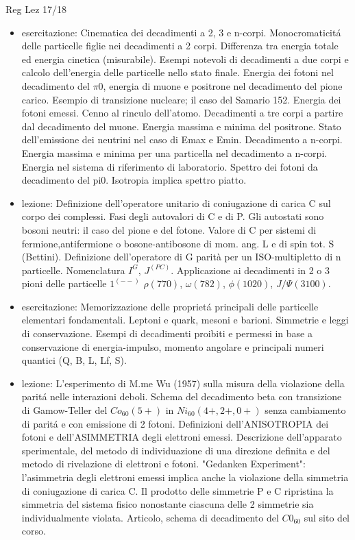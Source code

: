 \begin{frame}[allowframebreaks]{Reg Lez 17/18}
\begin{itemize}
\item esercitazione: Cinematica dei decadimenti a 2, 3 e n-corpi. Monocromaticit\'a delle particelle figlie nei decadimenti a 2 corpi. Differenza tra energia totale ed energia cinetica (misurabile). Esempi notevoli di decadimenti a due corpi e calcolo dell'energia delle particelle nello stato finale. Energia dei fotoni nel decadimento del $\pi0$, energia di muone e positrone nel decadimento del pione carico. Esempio di transizione nucleare; il caso del Samario 152. Energia dei fotoni emessi. Cenno al rinculo dell'atomo. Decadimenti a tre corpi a partire dal decadimento del muone. Energia massima e minima del positrone. Stato dell'emissione dei neutrini nel caso di Emax e Emin. Decadimento a n-corpi. Energia massima e minima per una particella nel decadimento a n-corpi. Energia nel sistema di riferimento di laboratorio. Spettro dei fotoni da decadimento del pi0. Isotropia implica spettro piatto.
\item lezione: Definizione dell'operatore unitario di coniugazione di carica C sul corpo dei complessi. Fasi degli autovalori di C e di P. Gli autostati sono bosoni neutri: il caso del pione e del fotone. Valore di C per sistemi di fermione,antifermione o bosone-antibosone di mom. ang. L e di spin tot. S (Bettini). Definizione dell'operatore di G parità per un ISO-multipletto di n particelle. Nomenclatura $I^G$, $J^{(PC)}$. Applicazione ai decadimenti in 2 o 3 pioni delle particelle $1^{(--)}$ $\rho(770)$, $\omega(782)$, $\phi(1020)$, $J/\Psi(3100)$.
\item esercitazione: Memorizzazione delle propriet\'a principali delle particelle elementari fondamentali. Leptoni e quark, mesoni e barioni. Simmetrie e leggi di conservazione. Esempi di decadimenti proibiti e permessi in base a conservazione di energia-impulso, momento angolare e principali numeri quantici (Q, B, L, Lf, S).
\item lezione: L'esperimento di M.me Wu (1957) sulla misura della violazione della parit\'a nelle interazioni deboli. Schema del decadimento beta con transizione di Gamow-Teller del $Co_{60}(5+)$ in $Ni_{60}(4+,2+,0+)$ senza cambiamento di parit\'a e con emissione di 2 fotoni. Definizioni dell'ANISOTROPIA dei fotoni e dell'ASIMMETRIA degli elettroni emessi. Descrizione dell'apparato sperimentale, del metodo di individuazione di una direzione definita e del metodo di rivelazione di elettroni e fotoni. "Gedanken Experiment": l'asimmetria degli elettroni emessi implica anche la violazione della simmetria di coniugazione di carica C. Il prodotto delle simmetrie P e C ripristina la simmetria del sistema fisico nonostante ciascuna delle 2 simmetrie sia individualmente violata. Articolo, schema di decadimento del $C0_{60}$ sul sito del corso.

\end{itemize}
\end{frame}
